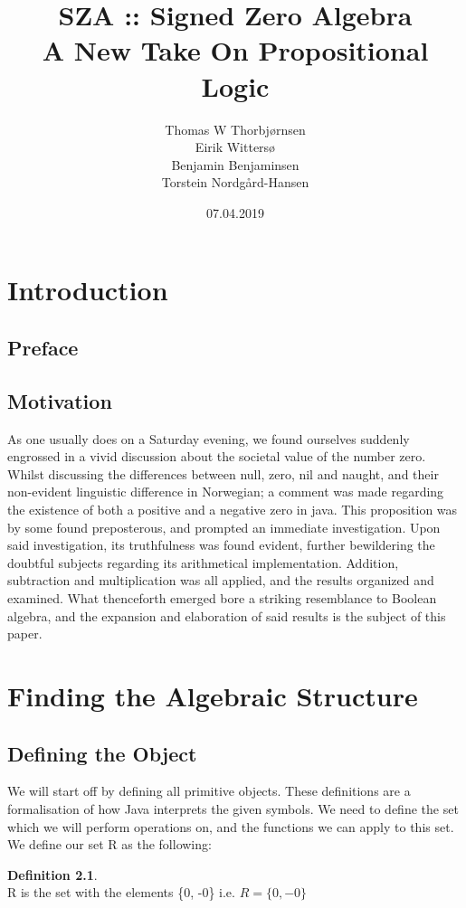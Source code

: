 \documentclass[12pt]{report}
\title{\Huge SZA :: Signed Zero Algebra \\
       \Large A New Take On Propositional Logic}
\author{{Thomas W Thorbjørnsen} \\
        {Eirik Wittersø} \\
        {Benjamin Benjaminsen} \\
        {Torstein Nordgård-Hansen}}
\date{07.04.2019}
\theoremstyle{definition}
\newtheorem{definition}{Definition}[section]
\theoremstyle{remark}
\begin{document}
\maketitle
\large
\tableofcontents
\newpage

\normalsize
\chapter{Introduction}
  \section{Preface}
  \section{Motivation}
    As one usually does on a Saturday evening,
    we found ourselves suddenly engrossed in a vivid discussion
    about the societal value of the number zero.
    Whilst discussing the differences between null, zero, nil and naught,
    and their non-evident linguistic difference in Norwegian;
    a comment was made regarding the existence of both a positive and a negative zero in java.
    This proposition was by some found preposterous, and prompted an immediate investigation.
    Upon said investigation, its truthfulness was found evident, further bewildering the doubtful subjects
    regarding its arithmetical implementation.
    Addition, subtraction and multiplication was all applied, and the results organized and examined.
    What thenceforth emerged bore a striking resemblance to Boolean algebra,
    and the expansion and elaboration of said results is the subject of this paper.

\chapter{Finding the Algebraic Structure}
  \section{Defining the Object}
    We will start off by defining all primitive objects. These definitions are a
    formalisation of how Java interprets the given symbols. We need to define the set
    which we will perform operations on, and the functions we can apply to this set.
    We define our set R as the following: \\

    \begin{definition}$\ $\\
    R is the set with the elements \{0, -0\} i.e. $R=\{0,-0\}$
    \end{definition}
\end{document}
